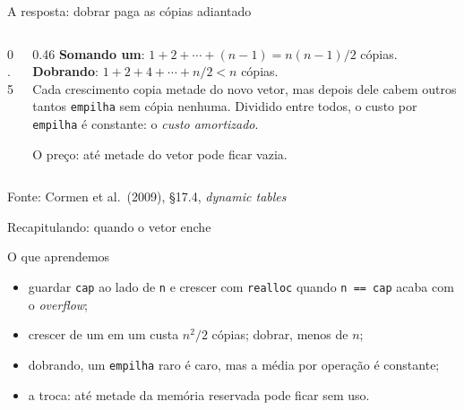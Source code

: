 \documentclass[aspectratio=169]{beamer}
\newcommand{\fonte}[1]{\vfill\hfill{\scriptsize\textcolor{UFSGray}{Fonte: #1}}}
\begin{document}
\begin{frame}{A resposta: dobrar paga as cópias adiantado}
  \begin{columns}[c]
    \begin{column}{0.5\textwidth}
      \begin{center}
      \end{center}
    \end{column}
    \begin{column}{0.46\textwidth}
      \small
      \textbf{Somando um}: $1 + 2 + \cdots + (n-1) = n(n-1)/2$ cópias.\\[0.4em]
      \textbf{Dobrando}: $1 + 2 + 4 + \cdots + n/2 < n$ cópias.\\[0.6em]
      Cada crescimento copia metade do novo vetor, mas depois dele cabem
      outros tantos \texttt{empilha} sem cópia nenhuma. Dividido entre todos,
      o custo por \texttt{empilha} é constante: o \emph{custo amortizado}.

      \medskip
      O preço: até metade do vetor pode ficar vazia.
    \end{column}
  \end{columns}
  \fonte{Cormen et al.\ (2009), §17.4, \emph{dynamic tables}~\cite{cormen2009introduction}}
\end{frame}

\begin{frame}{Recapitulando: quando o vetor enche}
  \begin{block}{O que aprendemos}
    \begin{itemize}
      \item guardar \texttt{cap} ao lado de \texttt{n} e crescer com
        \texttt{realloc} quando \texttt{n == cap} acaba com o \emph{overflow};
      \item crescer de um em um custa $n^2/2$ cópias; dobrar, menos de $n$;
      \item dobrando, um \texttt{empilha} raro é caro, mas a média por
        operação é constante;
      \item a troca: até metade da memória reservada pode ficar sem uso.
    \end{itemize}
  \end{block}
\end{frame}
\end{document}
